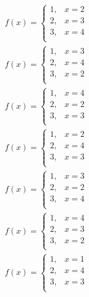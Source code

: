 \documentclass{article}
\begin{document}
\begin{eqnarray}
f(x)=\begin{cases}
1,& x=2\nonumber\\
2,& x=3\nonumber\\
3,& x=4\nonumber\\
\end{cases}
\end{eqnarray}
\begin{eqnarray}
f(x)=\begin{cases}
1,& x=3\nonumber\\
2,& x=4\nonumber\\
3,& x=2\nonumber\\
\end{cases}
\end{eqnarray}
\begin{eqnarray}
f(x)=\begin{cases}
1,& x=4\nonumber\\
2,& x=2\nonumber\\
3,& x=3\nonumber\\
\end{cases}
\end{eqnarray}
\begin{eqnarray}
f(x)=\begin{cases}
1,& x=2\nonumber\\
2,& x=4\nonumber\\
3,& x=3\nonumber\\
\end{cases}
\end{eqnarray}
\begin{eqnarray}
f(x)=\begin{cases}
1,& x=3\nonumber\\
2,& x=2\nonumber\\
3,& x=4\nonumber\\
\end{cases}
\end{eqnarray}
\begin{eqnarray}
f(x)=\begin{cases}
1,& x=4\nonumber\\
2,& x=3\nonumber\\
3,& x=2\nonumber\\
\end{cases}
\end{eqnarray}
\begin{eqnarray}
f(x)=\begin{cases}
1,& x=1\nonumber\\
2,& x=4\nonumber\\
3,& x=3\nonumber\\
\end{cases}
\end{eqnarray}
\end{document}
